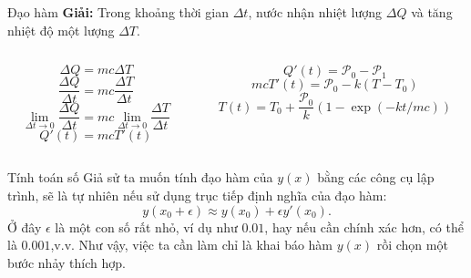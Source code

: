 \begin{frame}{Đạo hàm}
\textbf{Giải:} Trong khoảng thời gian \(\Delta t\), nước nhận nhiệt lượng \(\Delta Q\) và tăng nhiệt độ một lượng \(\Delta T\).
\begin{columns}
    \begin{column}{0.5\textwidth}
\begin{equation}
\Delta Q=mc\Delta T
\end{equation}
\begin{equation}
\dfrac{\Delta Q}{\Delta t}=mc\dfrac{\Delta T}{\Delta t}
\end{equation}
\begin{equation}
\lim_{\Delta t\to 0}\dfrac{\Delta Q}{\Delta t}=mc\lim_{\Delta t\to 0}\dfrac{\Delta T}{\Delta t}
\end{equation}
\begin{equation}
    Q'(t)=mcT'(t)
\end{equation}
    \end{column}
    \begin{column}{0.5\textwidth}
\begin{equation}
Q'(t)=\mathcal{P}_0-\mathcal{P}_1
\end{equation}
\begin{equation}
\boxed{mcT'(t)=\mathcal{P}_0-k(T-T_0)}
\end{equation}
\begin{equation}
    T(t)=T_0+\dfrac{\mathcal P_0}{k}(1-\exp(-kt/mc))
\end{equation}
    \end{column}
\end{columns}
\end{frame}

\begin{frame}{Tính toán số}
Giả sử ta muốn tính đạo hàm của \(y(x)\) bằng các công cụ lập trình, sẽ là tự nhiên nếu sử dụng trục tiếp định nghĩa của đạo hàm:
\[y(x_0+\epsilon)\approx y(x_0)+\epsilon y'(x_0).\] Ở đây \(\epsilon\) là một con số rất nhỏ, ví dụ như \(0.01\), hay nếu cần chính xác hơn, có thể là \(0.001\),v.v. Như vậy, việc ta cần làm chỉ là khai báo hàm \(y(x)\) rồi chọn một bước nhảy thích hợp. 
\end{frame}
